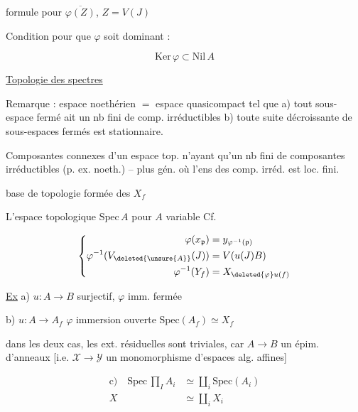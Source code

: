 formule pour $\overline{\varphi(Z)}$, $Z=V(J)$

Condition pour que $\varphi$ soit dominant :

\[
\mathrm{Ker}\,\varphi\subset\mathrm{Nil}\,A
\]


\uline{Topologie des spectres}

Remarque : espace noethérien $=$  espace quasicompact tel que a) tout sous-espace fermé ait un nb fini de comp. irréductibles b) toute suite décroissante de sous-espaces fermés  est stationnaire.

Composantes connexes d'un espace top. n'ayant qu'un nb fini de composantes irréductibles (p. ex. noeth.) -- plus gén. où l'ens des comp. irréd. est loc. fini.

 base de topologie formée des $X_f$ 

L'espace topologique $\mathrm{Spec}\,A$ pour $A$ variable \quad Cf.


\[
\left\{\begin{aligned}
\varphi(x_{\mathfrak p})&=y_{\varphi^{-1}(\mathfrak p)}\\
\varphi^{-1}(V_{\deleted{\unsure{A}}}(J))&=V(u(J)B)\\
\varphi^{-1}(Y_f)&=X_{\deleted{\varphi}u(f)}
\end{aligned}\right.
\]

\uline{Ex} a)  $u:A\to B$ surjectif, $\varphi$ imm. fermée

b)  $u:A\to A_f$ \qquad $\varphi$ immersion ouverte \qquad $\mathrm{Spec}(A_f)\simeq X_f$

dans les deux cas, les ext. résiduelles sont triviales, car $A\to B$ un épim. d'anneaux [i.e. $\mathscr X\to\mathscr Y$ un monomorphisme d'espaces alg. affines]

\[
\begin{aligned}
\text{c)}\quad \mathrm{Spec}\,\prod_I A_i&\simeq\coprod_i\mathrm{Spec}(A_i)\\
X&\simeq\coprod_i X_i
\end{aligned}
\]

